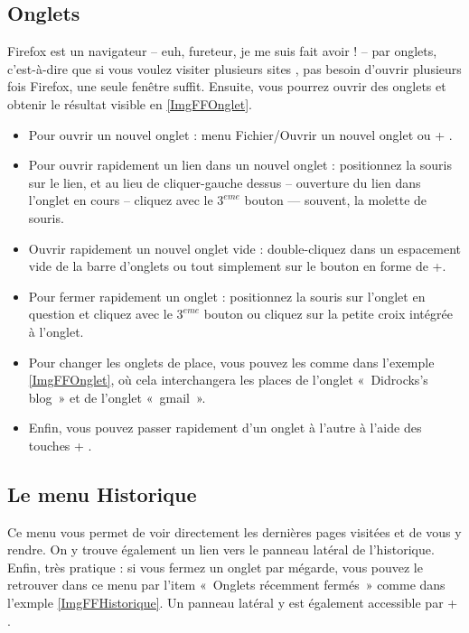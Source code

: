 \subsection{Onglets}
\label{RefFFOnglets}
Firefox est un navigateur -- euh, fureteur, je me suis fait avoir ! --  par onglets, c'est-à-dire que si vous voulez visiter plusieurs sites , pas besoin d'ouvrir plusieurs fois Firefox, une seule fenêtre suffit. Ensuite, vous pourrez ouvrir des onglets et obtenir le résultat visible en \ref{ImgFFOnglet}.\par
{}
\begin{itemize}
\item Pour ouvrir un nouvel onglet : menu Fichier/Ouvrir un nouvel onglet ou  + .
\item Pour ouvrir rapidement un lien dans un nouvel onglet : positionnez la souris sur le lien, et au lieu de cliquer-gauche dessus -- ouverture du lien dans l'onglet en cours -- cliquez avec le $3^{eme}$ bouton --- souvent, la molette de souris.
\item Ouvrir rapidement un nouvel onglet vide : double-cliquez dans un espacement vide de la barre d'onglets ou tout simplement sur le bouton en forme de +.
\item Pour fermer rapidement un onglet : positionnez la souris sur l'onglet en question et cliquez avec le $3^{eme}$ bouton ou cliquez sur la petite croix intégrée à l'onglet.
\item Pour changer les onglets de place, vous pouvez les  comme dans l'exemple \ref{ImgFFOnglet}, où cela interchangera les places de l'onglet «~Didrocks's blog~» et de l'onglet «~gmail~».
\item Enfin, vous pouvez passer rapidement d'un onglet à l'autre à l'aide des touches  + .
\end{itemize}
\subsection{Le menu Historique}
Ce menu vous permet de voir directement les dernières pages visitées et de vous y rendre. On y trouve également un lien vers le panneau latéral de l'historique. Enfin, très pratique : si vous fermez un onglet par mégarde, vous pouvez le retrouver dans ce menu par l'item «~Onglets récemment fermés~» comme dans l'exmple \ref{ImgFFHistorique}. Un panneau latéral y est également accessible par  + .
